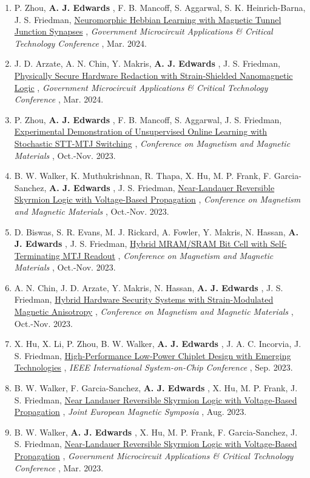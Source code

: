 \documentclass[12pt]{article}
\begin{document}
\begin{enumerate}
\item P. Zhou, \textbf{A. J. Edwards} , F. B. Mancoff, S. Aggarwal, S. K. Heinrich-Barna, J. S. Friedman, \ul{Neuromorphic Hebbian Learning with Magnetic Tunnel Junction Synapses} , \textit{Government Microcircuit Applications \& Critical Technology Conference} , Mar. 2024.
\item J. D. Arzate, A. N. Chin, Y. Makris, \textbf{A. J. Edwards} , J. S. Friedman, \ul{Physically Secure Hardware Redaction with Strain-Shielded Nanomagnetic Logic} , \textit{Government Microcircuit Applications \& Critical Technology Conference} , Mar. 2024.
\item P. Zhou, \textbf{A. J. Edwards} , F. B. Mancoff, S. Aggarwal, J. S. Friedman, \ul{Experimental Demonstration of Unsupervised Online Learning with Stochastic STT-MTJ Switching} , \textit{Conference on Magnetism and Magnetic Materials} , Oct.-Nov. 2023.
\item B. W. Walker, K. Muthukrishnan, R. Thapa, X. Hu, M. P. Frank, F. Garcia-Sanchez, \textbf{A. J. Edwards} , J. S. Friedman, \ul{Near-Landauer Reversible Skyrmion Logic with Voltage-Based Propagation} , \textit{Conference on Magnetism and Magnetic Materials} , Oct.-Nov. 2023.
\item D. Biswas, S. R. Evans, M. J. Rickard, A. Fowler, Y. Makris, N. Hassan, \textbf{A. J. Edwards} , J. S. Friedman, \ul{Hybrid MRAM/SRAM Bit Cell with Self-Terminating MTJ Readout} , \textit{Conference on Magnetism and Magnetic Materials} , Oct.-Nov. 2023.
\item A. N. Chin, J. D. Arzate, Y. Makris, N. Hassan, \textbf{A. J. Edwards} , J. S. Friedman, \ul{Hybrid Hardware Security Systems with Strain-Modulated Magnetic Anisotropy} , \textit{Conference on Magnetism and Magnetic Materials} , Oct.-Nov. 2023.
\item X. Hu, X. Li, P. Zhou, B. W. Walker, \textbf{A. J. Edwards} , J. A. C. Incorvia, J. S. Friedman, \ul{High-Performance Low-Power Chiplet Design with Emerging Technologies} , \textit{IEEE International System-on-Chip Conference} , Sep. 2023.
\item B. W. Walker, F. Garcia-Sanchez, \textbf{A. J. Edwards} , X. Hu, M. P. Frank, J. S. Friedman, \ul{Near Landauer Reversible Skyrmion Logic with Voltage-Based Propagation} , \textit{Joint European Magnetic Symposia} , Aug. 2023.
\item B. W. Walker, \textbf{A. J. Edwards} , X. Hu, M. P. Frank, F. Garcia-Sanchez, J. S. Friedman, \ul{Near-Landauer Reversible Skyrmion Logic with Voltage-Based Propagation} , \textit{Government Microcircuit Applications \& Critical Technology Conference} , Mar. 2023.

\end{enumerate}
\end{document}
